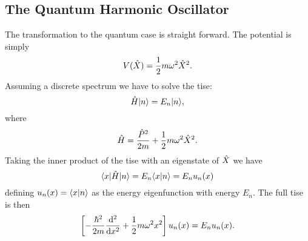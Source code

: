     \subsection{The Quantum Harmonic Oscillator}
    The transformation to the quantum case is straight forward.
    The potential is simply
    \[V(\hat{X}) = \frac{1}{2}m\omega^2\hat{X}^2.\]
    Assuming a discrete spectrum we have to solve the \gls{tise}:
    \[\hat{H}\vert {n} \rangle = E_n\vert {n} \rangle,\]
    where
    \[\hat{H} = \frac{\hat{P}^2}{2m} + \frac{1}{2}m\omega^2\hat{X}^2.\]
    Taking the inner product of the \gls{tise} with an eigenstate of \(\hat{X}\) we have
    \[\langle {x} \vert\hat{H}\vert {n} \rangle = E_n\langle {x} \vert {n} \rangle = E_nu_n(x)\]
    defining \(u_n(x) = \langle {x} \vert {n} \rangle\) as the energy eigenfunction with energy \(E_n\).
    The full \gls{tise} is then
    \[\left[-\frac{\hbar^2}{2m}\dv[2]{x} + \frac{1}{2}m\omega^2 x^2\right]u_n(x) = E_nu_n(x).\]
    
